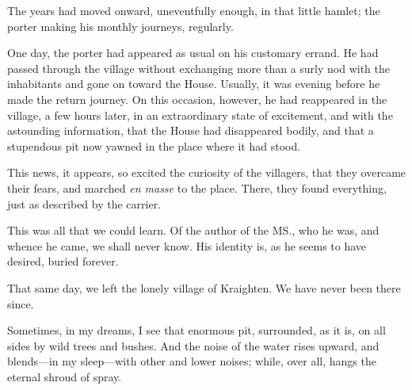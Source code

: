 The years had moved onward, uneventfully enough, in that little hamlet; the porter making his monthly journeys, regularly.

One day, the porter had appeared as usual on his customary errand. He had passed through the village without exchanging more than a surly nod with the inhabitants and gone on toward the House. Usually, it was evening before he made the return journey. On this occasion, however, he had reappeared in the village, a few hours later, in an extraordinary state of excitement, and with the astounding information, that the House had disappeared bodily, and that a stupendous pit now yawned in the place where it had stood.

This news, it appears, so excited the curiosity of the villagers, that they overcame their fears, and marched \textit{en masse} to the place. There, they found everything, just as described by the carrier.

This was all that we could learn. Of the author of the MS., who he was, and whence he came, we shall never know. His identity is, as he seems to have desired, buried forever.

That same day, we left the lonely village of Kraighten. We have never been there since.

Sometimes, in my dreams, I see that enormous pit, surrounded, as it is, on all sides by wild trees and bushes. And the noise of the water rises upward, and blends---in my sleep---with other and lower noises; while, over all, hangs the eternal shroud of spray.

\clearpage %
